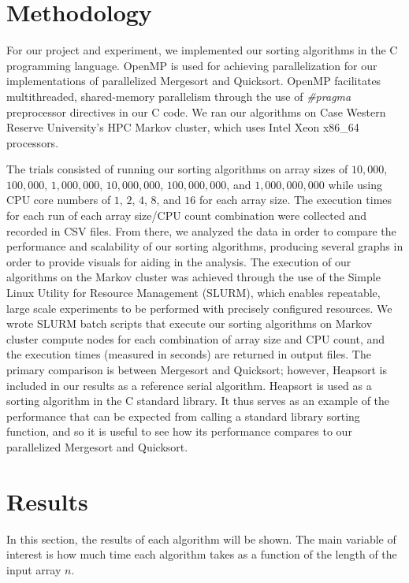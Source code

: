 \documentclass[conference]{IEEEtran}
\begin{document}
	\section{Methodology}
	For our project and experiment, we implemented our sorting algorithms in the C programming language. OpenMP \cite{openmp08} is used for achieving parallelization for our implementations of parallelized Mergesort and Quicksort.
	OpenMP facilitates multithreaded, shared-memory parallelism through the use of \textit{\#pragma} preprocessor directives in our C code.
	We ran our algorithms on Case Western Reserve University's HPC Markov cluster, which uses Intel Xeon x86\_64 processors.
	
	The trials consisted of running our sorting algorithms on array sizes of $10,000$, $100,000$, $1,000,000$, $10,000,000$, $100,000,000$, and $1,000,000,000$ while using CPU core numbers of $1$, $2$, $4$, $8$, and $16$ for each array size. The execution times for each run of each array size/CPU count combination were collected and recorded in CSV files. From there, we analyzed the data in order to compare the performance and scalability of our sorting algorithms, producing several graphs in order to provide visuals for aiding in the analysis. The execution of our algorithms on the Markov cluster was achieved through the use of the Simple Linux Utility for Resource Management \cite{yoo_slurm_2003} (SLURM), which enables repeatable, large scale experiments to be performed with precisely configured resources. We wrote SLURM batch scripts that execute our sorting algorithms on Markov cluster compute nodes for each combination of array size and CPU count, and the execution times (measured in seconds) are returned in output files. The primary comparison is between Mergesort and Quicksort; however, Heapsort is included in our results as a reference serial algorithm. Heapsort is used as a sorting algorithm in the C standard library. It thus serves as an example of the performance that can be expected from calling a standard library sorting function, and so it is useful to see how its performance compares to our parallelized Mergesort and Quicksort.
	
	
	\section{Results}
	In this section, the results of each algorithm will be shown.
	The main variable of interest is how much time each algorithm takes as a function of the length of the input array $n$.
	
\end{document}
